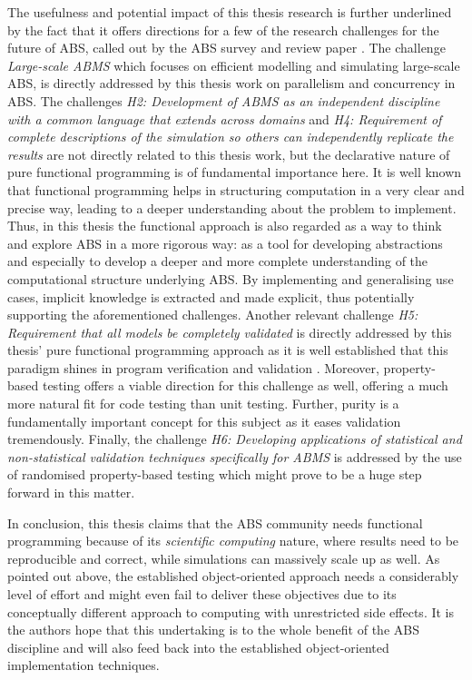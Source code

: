 The usefulness and potential impact of this thesis research is further underlined by the fact that it offers directions for a few of the research challenges for the future of ABS, called out by the ABS survey and review paper \cite{macal_everything_2016}. The challenge \textit{Large-scale ABMS} which focuses on efficient modelling and simulating large-scale ABS, is directly addressed by this thesis work on parallelism and concurrency in ABS. The challenges \emph{H2: Development of ABMS as an independent discipline with a common language that extends across domains} and \emph{H4: Requirement of complete descriptions of the simulation so others can independently replicate the results} are not directly related to this thesis work, but the declarative nature of pure functional programming is of fundamental importance here. It is well known that functional programming helps in structuring computation in a very clear and precise way, leading to a deeper understanding about the problem to implement. Thus, in this thesis the functional approach is also regarded as a way to think and explore ABS in a more rigorous way: as a tool for developing abstractions and especially to develop a deeper and more complete understanding of the computational structure underlying ABS. By implementing and generalising use cases, implicit knowledge is extracted and made explicit, thus potentially supporting the aforementioned challenges. Another relevant challenge \emph{H5: Requirement that all models be completely validated} is directly addressed by this thesis' pure functional programming approach as it is well established that this paradigm shines in program verification and validation \cite{hudak_history_2007, hutton_tutorial_1999}. Moreover, property-based testing offers a viable direction for this challenge as well, offering a much more natural fit for code testing than unit testing. Further, purity is a fundamentally important concept for this subject as it eases validation tremendously. Finally, the challenge \emph{H6: Developing applications of statistical and non-statistical validation techniques specifically for ABMS} is addressed by the use of randomised property-based testing which might prove to be a huge step forward in this matter.

\medskip

In conclusion, this thesis claims that the ABS community needs functional programming because of its \textit{scientific computing} nature, where results need to be reproducible and correct, while simulations can massively scale up as well. As pointed out above, the established object-oriented approach needs a considerably level of effort and might even fail to deliver these objectives due to its conceptually different approach to computing with unrestricted side effects. It is the authors hope that this undertaking is to the whole benefit of the ABS discipline and will also feed back into the established object-oriented implementation techniques.

